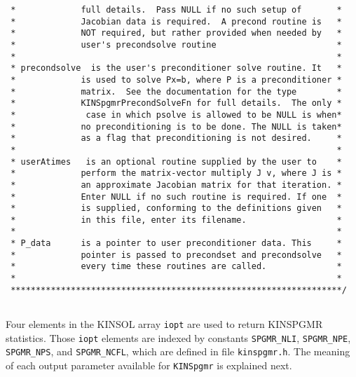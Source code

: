 \documentclass[11pt]{article}
\begin{document}
\begin{verbatim}
 *             full details.  Pass NULL if no such setup of       *
 *             Jacobian data is required.  A precond routine is   *
 *             NOT required, but rather provided when needed by   *
 *             user's precondsolve routine                        *
 *                                                                *
 * precondsolve  is the user's preconditioner solve routine. It   *
 *             is used to solve Px=b, where P is a preconditioner *
 *             matrix.  See the documentation for the type        *
 *             KINSpgmrPrecondSolveFn for full details.  The only *
 *              case in which psolve is allowed to be NULL is when*
 *             no preconditioning is to be done. The NULL is taken*
 *             as a flag that preconditioning is not desired.     *
 *                                                                *
 * userAtimes   is an optional routine supplied by the user to    *
 *             perform the matrix-vector multiply J v, where J is *
 *             an approximate Jacobian matrix for that iteration. *
 *             Enter NULL if no such routine is required. If one  *
 *             is supplied, conforming to the definitions given   *
 *             in this file, enter its filename.                  *
 *                                                                *
 * P_data      is a pointer to user preconditioner data. This     *
 *             pointer is passed to precondset and precondsolve   *
 *             every time these routines are called.              *
 *                                                                *
 ******************************************************************/
  
\end{verbatim}
Four elements in the KINSOL array {\tt iopt} are used to return KINSPGMR
statistics. Those {\tt iopt} elements are indexed by constants
{\tt SPGMR\_NLI}, {\tt SPGMR\_NPE}, {\tt SPGMR\_NPS}, and {\tt SPGMR\_NCFL}, 
which are defined in file {\tt kinspgmr.h}. The meaning of each output 
parameter available for {\tt KINSpgmr} is explained next.
\end{document}
